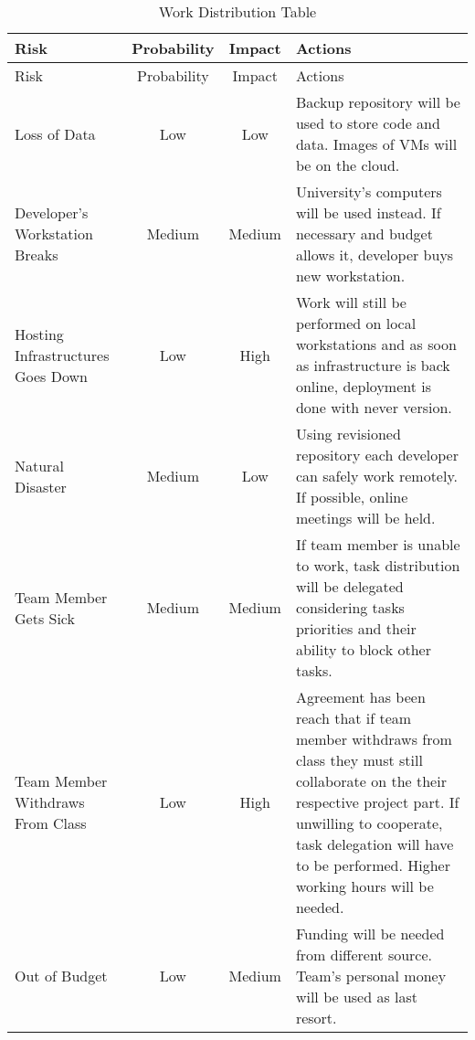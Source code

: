 \begin{center}
\setlength{\extrarowheight}{1.5pt}
    \begin{longtable}{|m{5cm}|c|c|m{7cm}|}
 \caption{Work Distribution Table} \\
     \hline
    
    \centering  Risk & Probability & Impact & Actions \\
    \hline \hline \endfirsthead
    
         \hline

	\centering  Risk & Probability & Impact & Actions \\    
	\hline \hline \endhead
    
    \endfoot  
Loss of Data    & Low           & Low      & Backup repository will be used to store code and data. Images of VMs will be on the cloud.       \\ \hline
Developer's Workstation Breaks  & Medium           & Medium      & University's computers will be used instead. If necessary and budget allows it, developer buys new workstation.       \\  \hline
    Hosting Infrastructures Goes Down    & Low           & High      & Work will still be performed on local workstations and as soon as infrastructure is back online, deployment is done with never version.       \\  \hline
    Natural Disaster    & Medium           & Low      & Using revisioned repository each developer can safely work remotely. If possible, online meetings will be held.       \\  \hline
    Team Member Gets Sick    & Medium           & Medium      & If team member is unable to work, task distribution will be delegated considering tasks priorities and their ability to block other tasks.       \\  \hline
    Team Member Withdraws From Class   & Low           & High      & Agreement has been reach that if team member withdraws from class they must still collaborate on the their respective project part. If unwilling to cooperate, task delegation will have to be performed. Higher working hours will be needed.       \\  \hline
    Out of Budget    & Low           & Medium      & Funding will be needed from different source. Team's personal money will be used as last resort.       \\  \hline
\end{longtable}
\end{center}
